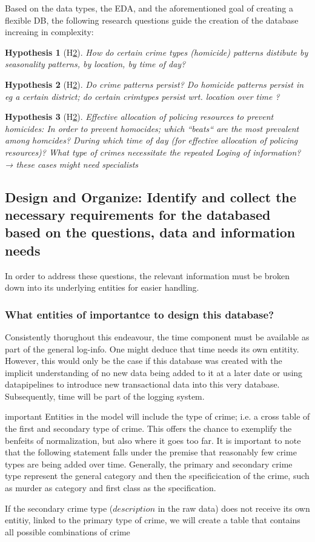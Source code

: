 \documentclass[a4paper]{article}
\newtheorem{hyp}{Hypothesis}
\begin{document}
Based on the data types, the EDA, and the aforementioned goal of creating a flexible DB, the following research questions guide the creation of the database increaing in complexity:


\begin{hyp}[H\ref{hyp:second}] \label{hyp:first}
How do certain crime types (homicide) patterns distibute by seasonality patterns, by location, by time of day?
\end{hyp}

\begin{hyp}[H\ref{hyp:second}] \label{hyp:second}
Do crime patterns persist? Do homicide patterns persist in eg a certain district; do certain crimtypes persist wrt. location over time ?
\end{hyp}

\begin{hyp}[H\ref{hyp:second}] \label{hyp:third}
Effective allocation of policing resources to prevent homicides:
In order to prevent homocides; which “beats“ are the most prevalent among homcides? During which time of day (for effective allocation of policing resources)? 
 What type of crimes necessitate the repeated Loging of information? → these cases might need specialists
\end{hyp}



\subsection{Design and Organize: Identify and collect the necessary requirements for the databased based on the questions, data and information needs}
In order to address these questions, the relevant information must be broken down into its underlying entities for easier handling. 

\subsubsection{What entities of importantce to design this database?}
Consistently thorughout this endeavour, the time component must be available as part of the general log-info. One might deduce that time needs its own entitity. However, this would only be the case if this database was created with the implicit understanding of no new data being added to it at a later date or using datapipelines to introduce new transactional data into this very database. Subsequently, time will be part of the logging system. 

important Entities in the model will include the type of crime; i.e. a cross table of the first and secondary type of crime. This offers the chance to exemplify the benfeits of normalization, but also where it goes too far. It is important to note that the following statement falls under the premise that reasonably few crime types are being added over time. Generally, the primary and secondary crime type represent the general category and then the specificication of the crime, such as murder as category and first class as the specification. 



 If the secondary crime type ($description$ in the raw data) does not receive its own entitiy, linked to the primary type of crime, we will create a table that contains all possible combinations of crime 
\end{document}
